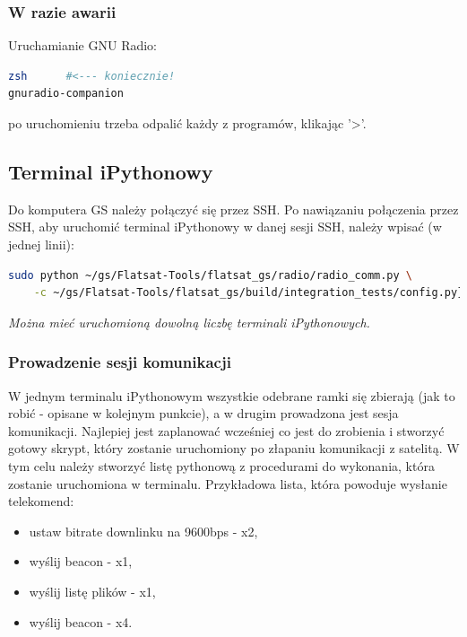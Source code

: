 \subsubsection{W razie awarii}

Uruchamianie GNU Radio:
\begin{lstlisting}[language=bash]
zsh      #<--- koniecznie!
gnuradio-companion
\end{lstlisting}
po uruchomieniu trzeba odpalić każdy z programów, klikając '>'.

\subsection{Terminal iPythonowy}

Do komputera GS należy połączyć się przez SSH. Po nawiązaniu połączenia przez SSH, aby uruchomić terminal iPythonowy w danej sesji SSH, należy wpisać (w jednej linii):

\begin{lstlisting}[language=bash]
sudo python ~/gs/Flatsat-Tools/flatsat_gs/radio/radio_comm.py \
	-c ~/gs/Flatsat-Tools/flatsat_gs/build/integration_tests/config.py}
\end{lstlisting}

\textit{Można mieć uruchomioną dowolną liczbę terminali iPythonowych.}

\subsubsection{Prowadzenie sesji komunikacji}

W jednym terminalu iPythonowym wszystkie odebrane ramki się zbierają (jak to robić - opisane w kolejnym punkcie), a w drugim prowadzona jest sesja komunikacji. Najlepiej jest zaplanować wcześniej co jest do zrobienia i stworzyć gotowy skrypt, który zostanie uruchomiony po złapaniu komunikacji z satelitą. W tym celu należy stworzyć listę pythonową z procedurami do wykonania, która zostanie uruchomiona w terminalu. Przykładowa lista, która powoduje wysłanie telekomend:

\begin{itemize}
	\item ustaw bitrate downlinku na 9600bps - x2,
	\item wyślij beacon - x1,
	\item wyślij listę plików - x1,
	\item wyślij beacon - x4.
\end{itemize}

